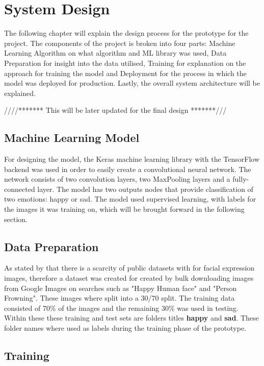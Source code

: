 \chapter{System Design}
The following chapter will explain the design process for the prototype for the project. The components of the project is broken into four parts: Machine Learning Algorithm on what algorithm and ML library was used, Data Preparation for insight into the data utilised, Training for explanation on the approach for training the model and Deployment for the process in which the model was deployed for production. Lastly, the overall system architecture will be explained.

////******* This will be later updated for the final design *******///

\section{Machine Learning Model}

For designing the model, the Keras machine learning library with the TensorFlow backend was used in order to easily create a convolutional neural network. The network consists of two convolution layers, two MaxPooling layers and a fully-connected layer. The model has two outputs nodes that provide classification of two emotions: happy or sad. The model used supervised learning, with labels for the images it was training on, which will be brought forward in the following section.\\


\section{Data Preparation}
As stated by \citeauthor*{LOPES} that there is a scarcity of public datasets with for facial expression images, therefore a dataset was created for created by bulk downloading images from Google Images on searches such as "Happy Human face" and "Person Frowning". These images where split into a 30/70 split. The training data consisted of 70\% of the images and the remaining 30\% was used in testing. Within these these training and test sets are folders titles \textbf{happy} and \textbf{sad}. These folder names where used as labels during the training phase of the prototype.

\section{Training}

